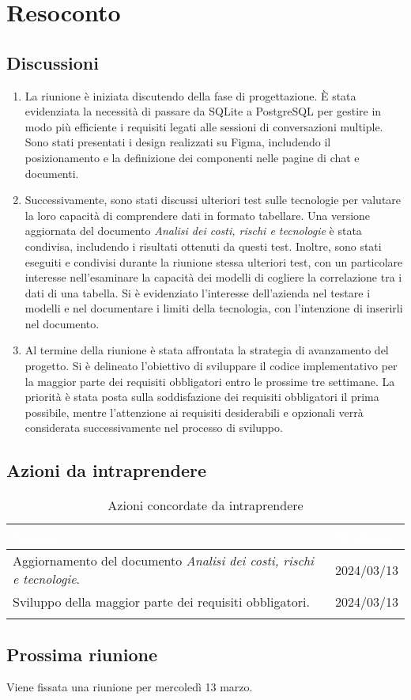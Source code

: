 \section{Resoconto} \label{sec:resoconto}
\subsection{Discussioni} \label{subsec:resdiscussione}
\begin{enumerate}
    \item La riunione è iniziata discutendo della fase di progettazione. È stata evidenziata la necessità di passare da SQLite a PostgreSQL per gestire in modo più efficiente i requisiti legati alle sessioni di conversazioni multiple. Sono stati presentati i design realizzati su Figma, includendo il posizionamento e la definizione dei componenti nelle pagine di chat e documenti.
    \item Successivamente, sono stati discussi ulteriori test sulle tecnologie per valutare la loro capacità di comprendere dati in formato tabellare. Una versione aggiornata del documento \textit{Analisi dei costi, rischi e tecnologie} è stata condivisa, includendo i risultati ottenuti da questi test. Inoltre, sono stati eseguiti e condivisi durante la riunione stessa ulteriori test, con un particolare interesse nell'esaminare la capacità dei modelli di cogliere la correlazione tra i dati di una tabella. Si è evidenziato l'interesse dell'azienda nel testare i modelli e nel documentare i limiti della tecnologia, con l'intenzione di inserirli nel documento.
    \item Al termine della riunione è stata affrontata la strategia di avanzamento del progetto. Si è delineato l'obiettivo di sviluppare il codice implementativo per la maggior parte dei requisiti obbligatori entro le prossime tre settimane. La priorità è stata posta sulla soddisfazione dei requisiti obbligatori il prima possibile, mentre l'attenzione ai requisiti desiderabili e opzionali verrà considerata successivamente nel processo di sviluppo.
\end{enumerate}


\subsection{Azioni da intraprendere} \label{subsec:action}

{
\setlength{\tabcolsep}{10pt}
\renewcommand{\arraystretch}{1.5}
\begin{xltabular}{\textwidth}{| X | c |}
    \hline
     \textbf{\textcolor{white}{Azione}} & \textbf{\textcolor{white}{Scadenza}} \\
    \hline
    \endhead
   Aggiornamento del documento \textit{Analisi dei costi, rischi e tecnologie}. & 2024/03/13\\
    \hline
    Sviluppo della maggior parte dei requisiti obbligatori. & 2024/03/13\\
    \hline
     \caption{Azioni concordate da intraprendere}
    \label{tab:reqimp}
\end{xltabular}
}


\subsection{Prossima riunione} \label{subsec:riunione}
Viene fissata una riunione per mercoledì 13 marzo.
